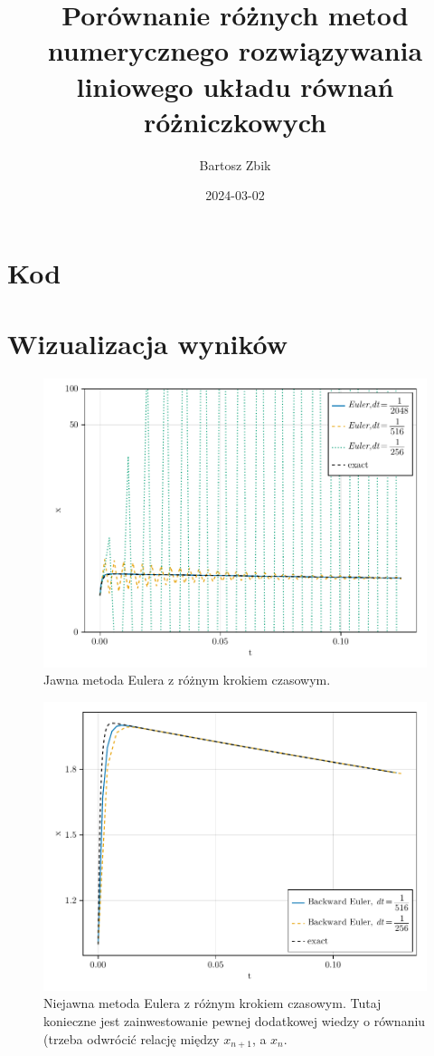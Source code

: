 \documentclass[12pt]{article}
\title{Porównanie różnych metod numerycznego rozwiązywania liniowego układu równań różniczkowych}
\author{Bartosz Zbik}
\date{2024-03-02} %
\begin{document}
\maketitle %

\section{Kod}



\section{Wizualizacja wyników}
\clearpage

\begin{figure}
\centering
\includegraphics[width=\textwidth]{euler-methods}
\caption{Jawna metoda Eulera z różnym krokiem czasowym.}
\end{figure}

\begin{figure}
\centering
\includegraphics[width=\textwidth]{BE-methods}
\caption{Niejawna metoda Eulera z różnym krokiem czasowym. Tutaj konieczne jest zainwestowanie pewnej dodatkowej wiedzy o równaniu (trzeba odwrócić relację między $x_{n+1}$, a $x_n$.}
\end{figure}
\end{document}
